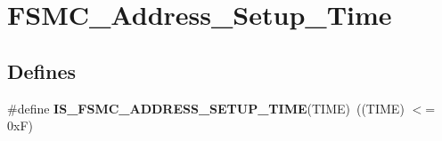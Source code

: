 \hypertarget{group__FSMC__Address__Setup__Time}{
\section{FSMC\_\-Address\_\-Setup\_\-Time}
\label{group__FSMC__Address__Setup__Time}
}
\subsection*{Defines}
\begin{DoxyCompactItemize}
\item 
\hypertarget{group__FSMC__Address__Setup__Time_ga8b77d090338011abc1be7f4a420e2d8f}{
\#define {\bfseries IS\_\-FSMC\_\-ADDRESS\_\-SETUP\_\-TIME}(TIME)~((TIME) $<$= 0xF)}
\label{group__FSMC__Address__Setup__Time_ga8b77d090338011abc1be7f4a420e2d8f}

\end{DoxyCompactItemize}
